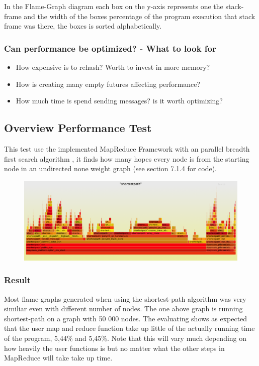 In the Flame-Graph diagram each box on the y-axis represents one the stack-frame and the width of the boxes percentage of the program execution that stack frame was there, the boxes is sorted alphabetically\cite{flamegraph}.
\subsubsection{Can performance be optimized? - What to look for}

\begin{itemize}
\item \blindtext How expensive is to rehash? Worth to invest in more memory?
\item \blindtext How is creating many empty futures affecting performance? 
\item \blindtext How much time is spend sending messages? is it worth optimizing?
\end{itemize}

\subsection{Overview Performance Test}
This test use the implemented MapReduce Framework with an parallel breadth first search algorithm \cite{mapreduce}, it finds how many hopes every node is from the starting node in an undirected none weight graph (see section 7.1.4 for code). \\ 

\begin{figure}[h]
\includegraphics[width=12cm]{images/FlameBig}
\end{figure}

\subsubsection{Result}
Most flame-graphs generated when using the shortest-path algorithm was very similiar even with different number of nodes. The one above graph is running shortest-path on a graph with 50 000 nodes. The evaluating shows as expected that the user map and reduce function take up little of the actually running time of the program, 5,44\% and 5,45\%. Note that this will vary much depending on how heavily the user functions is but no matter what the other steps in MapReduce will take take up time.

